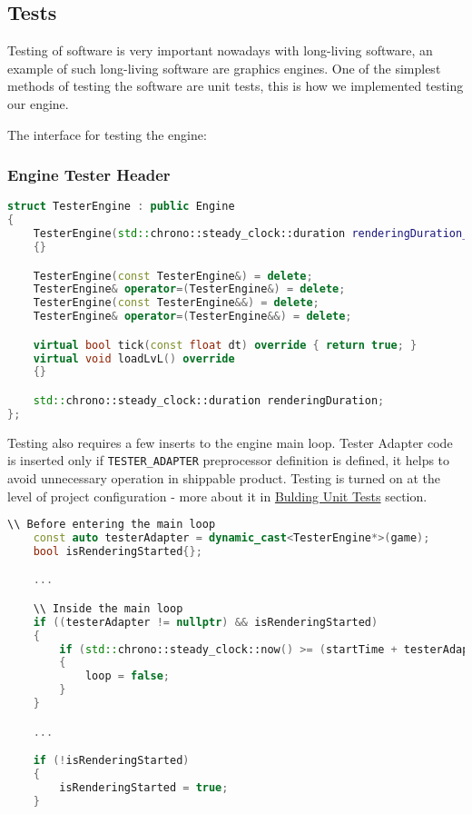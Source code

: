 \newpage

\subsection{Tests}
Testing of software is very important nowadays with long-living software, an example of such long-living software are graphics engines.
One of the simplest methods of testing the software are unit tests, this is how we implemented testing our engine.

The interface for testing the engine:
\subsubsection{Engine Tester Header}
\begin{lstlisting}[language=c++, caption=Tester Engine class (./engine/tests/tester.cpp)]
struct TesterEngine : public Engine
{
    TesterEngine(std::chrono::steady_clock::duration renderingDuration_) : renderingDuration{renderingDuration_}
    {}

    TesterEngine(const TesterEngine&) = delete;
    TesterEngine& operator=(TesterEngine&) = delete;
    TesterEngine(const TesterEngine&&) = delete;
    TesterEngine& operator=(TesterEngine&&) = delete;

    virtual bool tick(const float dt) override { return true; }
    virtual void loadLvL() override
    {}

    std::chrono::steady_clock::duration renderingDuration;
};
\end{lstlisting}


Testing also requires a few inserts to the engine main loop. Tester Adapter code is inserted only if \texttt{TESTER\_ADAPTER} preprocessor definition is defined, it helps to avoid unnecessary operation in shippable product. Testing is turned on at the level of project configuration - more about it in \hyperref[sec:build_unit_tests]{Bulding Unit Tests} section. 
\begin{lstlisting}[language=c++, caption=Tester related code inside Engine Main Loop (./engine/tests/tester.cpp)]
    \\ Before entering the main loop
    const auto testerAdapter = dynamic_cast<TesterEngine*>(game);
    bool isRenderingStarted{};

    ...

    \\ Inside the main loop
    if ((testerAdapter != nullptr) && isRenderingStarted)
    {
        if (std::chrono::steady_clock::now() >= (startTime + testerAdapter->renderingDuration))
        {
            loop = false;
        }
    }

    ...

    if (!isRenderingStarted)
    {
        isRenderingStarted = true;
    }
\end{lstlisting}

